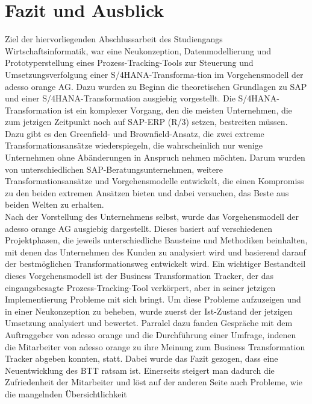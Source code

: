 \section{Fazit und Ausblick}
Ziel der hiervorliegenden Abschlussarbeit des Studiengangs Wirtschaftsinformatik, war eine Neukonzeption, Datenmodellierung und Prototyperstellung eines Prozess-Tracking-Tools zur Steuerung und Umsetzungsverfolgung einer S/4HANA-Transforma-tion im Vorgehensmodell der adesso orange AG. Dazu wurden zu Beginn die theoretischen Grundlagen zu SAP und einer S/4HANA-Transformation ausgiebig vorgestellt. Die S/4HANA-Transformation ist ein komplexer Vorgang, den die meisten Unternehmen, die zum jetzigen Zeitpunkt noch auf SAP-ERP (R/3) setzen, bestreiten müssen. Dazu gibt es den Greenfield- und Brownfield-Ansatz, die zwei extreme Transformationsansätze wiederspiegeln, die wahrscheinlich nur wenige Unternehmen ohne Abänderungen in Anspruch nehmen möchten. Darum wurden von unterschiedlichen SAP-Beratungsunternehmen, weitere Transformationsansätze und Vorgehensmodelle entwickelt, die einen Kompromiss zu den beiden extremen Ansätzen bieten und dabei versuchen, das \glqq{}Beste aus beiden Welten\grqq{} zu erhalten.\\Nach der Vorstellung des Unternehmens selbst, wurde das Vorgehensmodell der adesso orange AG ausgiebig dargestellt. Dieses basiert auf verschiedenen Projektphasen, die jeweils unterschiedliche Bausteine und Methodiken beinhalten, mit denen das Unternehmen des Kunden zu analysiert wird und basierend darauf der bestmöglichen Transformationsweg entwickelt wird. Ein wichtiger Bestandteil dieses Vorgehensmodell ist der Business Transformation Tracker, der das eingangsbesagte Prozess-Tracking-Tool verkörpert, aber in seiner jetzigen Implementierung Probleme mit sich bringt. Um diese Probleme aufzuzeigen und in einer Neukonzeption zu beheben, wurde zuerst der Ist-Zustand der jetzigen Umsetzung analysiert und bewertet. Parralel dazu fanden Gespräche mit dem Auftraggeber von adesso orange und die Durchführung einer Umfrage, indenen die Mitarbeiter von adesso orange zu ihre Meinung zum Business Transformation Tracker abgeben konnten, statt. Dabei wurde das Fazit gezogen, dass eine Neuentwicklung des BTT ratsam ist. Einerseits steigert man dadurch die Zufriedenheit der Mitarbeiter und löst auf der anderen Seite auch Probleme, wie die mangelnden Übersichtlichkeit
